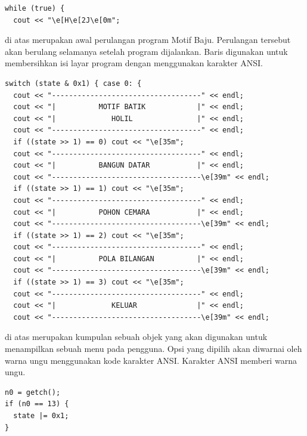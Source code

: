 \documentclass[../main.tex]{subfiles}
\begin{document}
\begin{code}
\begin{verbatim}
while (true) {
  cout << "\e[H\e[2J\e[0m";
\end{verbatim}
\end{code}

{\Script} di atas merupakan awal perulangan program Motif Baju. Perulangan tersebut akan berulang selamanya setelah program dijalankan. Baris \citecode{cout << "\textbackslash e[H\textbackslash [2J\textbackslash [0m";} digunakan untuk membersihkan isi layar program dengan menggunakan karakter ANSI.

\begin{code}
\begin{verbatim}
switch (state & 0x1) { case 0: {
  cout << "-----------------------------------" << endl;
  cout << "|          MOTIF BATIK            |" << endl;
  cout << "|             HOLIL               |" << endl;
  cout << "-----------------------------------" << endl;
  if ((state >> 1) == 0) cout << "\e[35m";
  cout << "-----------------------------------" << endl;
  cout << "|          BANGUN DATAR           |" << endl;
  cout << "-----------------------------------\e[39m" << endl;
  if ((state >> 1) == 1) cout << "\e[35m";
  cout << "-----------------------------------" << endl;
  cout << "|          POHON CEMARA           |" << endl;
  cout << "-----------------------------------\e[39m" << endl;
  if ((state >> 1) == 2) cout << "\e[35m";
  cout << "-----------------------------------" << endl;
  cout << "|          POLA BILANGAN          |" << endl;
  cout << "-----------------------------------\e[39m" << endl;
  if ((state >> 1) == 3) cout << "\e[35m";
  cout << "-----------------------------------" << endl;
  cout << "|             KELUAR              |" << endl;
  cout << "-----------------------------------\e[39m" << endl;
\end{verbatim}
\end{code}

{\Script} di atas merupakan kumpulan sebuah objek  yang akan digunakan untuk menampilkan sebuah menu pada pengguna. Opsi yang dipilih akan diwarnai oleh warna ungu menggunakan kode karakter ANSI. Karakter ANSI \citecode{\textbackslash e[39m} memberi warna ungu.

\begin{code}
\begin{verbatim}
n0 = getch();
if (n0 == 13) {
  state |= 0x1;
}
\end{verbatim}
\end{code}
\end{document}
